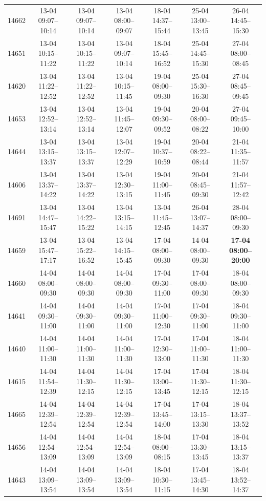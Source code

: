 \begin{table}[htbp]
\begin{tabular}{|r|c|c|c|c|c|c|}
14662 & 13-04 09:07--10:14 & 13-04 09:07--10:14 & 13-04 08:00--09:07 & 18-04 14:37--15:44 & 25-04 13:00--13:45 & 26-04 14:45--15:30 \\ 
14651 & 13-04 10:15--11:22 & 13-04 10:15--11:22 & 13-04 09:07--10:14 & 18-04 15:45--16:52 & 25-04 14:45--15:30 & 27-04 08:00--08:45 \\ 
14620 & 13-04 11:22--12:52 & 13-04 11:22--12:52 & 13-04 10:15--11:45 & 19-04 08:00--09:30 & 25-04 15:30--16:30 & 27-04 08:45--09:45 \\ 
14653 & 13-04 12:52--13:14 & 13-04 12:52--13:14 & 13-04 11:45--12:07 & 19-04 09:30--09:52 & 20-04 08:00--08:22 & 27-04 09:45--10:00 \\ 
14644 & 13-04 13:15--13:37 & 13-04 13:15--13:37 & 13-04 12:07--12:29 & 19-04 10:37--10:59 & 20-04 08:22--08:44 & 21-04 11:35--11:57 \\ 
14606 & 13-04 13:37--14:22 & 13-04 13:37--14:22 & 13-04 12:30--13:15 & 19-04 11:00--11:45 & 20-04 08:45--09:30 & 21-04 11:57--12:42 \\ 
14691 & 13-04 14:47--15:47 & 13-04 14:22--15:22 & 13-04 13:15--14:15 & 13-04 11:45--12:45 & 26-04 13:07--14:37 & 28-04 08:00--09:30 \\ 
14659 & 13-04 15:47--17:17 & 13-04 15:22--16:52 & 13-04 14:15--15:45 & 17-04 08:00--09:30 & 14-04 08:00--09:30 & \textbf{17-04 08:00--20:00} \\ 
14660 & 14-04 08:00--09:30 & 14-04 08:00--09:30 & 14-04 08:00--09:30 & 17-04 09:30--11:00 & 17-04 08:00--09:30 & 18-04 08:00--09:30 \\ 
14641 & 14-04 09:30--11:00 & 14-04 09:30--11:00 & 14-04 09:30--11:00 & 17-04 11:00--12:30 & 17-04 09:30--11:00 & 18-04 09:30--11:00 \\ 
14640 & 14-04 11:00--11:30 & 14-04 11:00--11:30 & 14-04 11:00--11:30 & 17-04 12:30--13:00 & 17-04 11:00--11:30 & 18-04 11:00--11:30 \\ 
14615 & 14-04 11:54--12:39 & 14-04 11:30--12:15 & 14-04 11:30--12:15 & 17-04 13:00--13:45 & 17-04 11:30--12:15 & 18-04 11:30--12:15 \\ 
14665 & 14-04 12:39--12:54 & 14-04 12:39--12:54 & 14-04 12:39--12:54 & 17-04 13:45--14:00 & 17-04 13:15--13:30 & 18-04 13:37--13:52 \\ 
14656 & 14-04 12:54--13:09 & 14-04 12:54--13:09 & 14-04 12:54--13:09 & 18-04 08:00--08:15 & 17-04 13:30--13:45 & 18-04 13:15--13:37 \\ 
14643 & 14-04 13:09--13:54 & 14-04 13:09--13:54 & 14-04 13:09--13:54 & 18-04 10:30--11:15 & 17-04 13:45--14:30 & 18-04 13:52--14:37 \\ 

\end{tabular}
\end{table}

